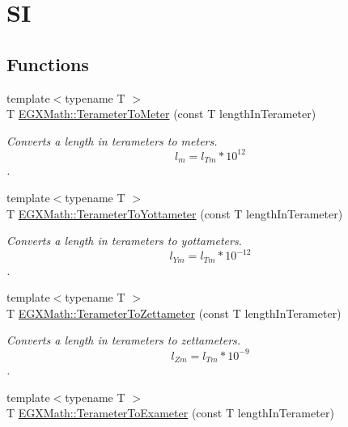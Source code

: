\hypertarget{group___e_g_x_math-_conversions-_length_conversions-_s_i-_terameter-_s_i}{}\section{SI}
\label{group___e_g_x_math-_conversions-_length_conversions-_s_i-_terameter-_s_i}
\subsection*{Functions}
\begin{DoxyCompactItemize}
\item 
{\footnotesize template$<$typename T $>$ }\\T \mbox{\hyperlink{group___e_g_x_math-_conversions-_length_conversions-_s_i-_terameter-_s_i_ga34f2674bfcf8fb79eda27adf607d0876}{E\+G\+X\+Math\+::\+Terameter\+To\+Meter}} (const T length\+In\+Terameter)
\begin{DoxyCompactList}\small\item\em Converts a length in terameters to meters. \[ l_{m}=l_{Tm} * 10^{12} \]. \end{DoxyCompactList}\item 
{\footnotesize template$<$typename T $>$ }\\T \mbox{\hyperlink{group___e_g_x_math-_conversions-_length_conversions-_s_i-_terameter-_s_i_gab0411fd993ebfe0b23de8d672203f68e}{E\+G\+X\+Math\+::\+Terameter\+To\+Yottameter}} (const T length\+In\+Terameter)
\begin{DoxyCompactList}\small\item\em Converts a length in terameters to yottameters. \[ l_{Ym}=l_{Tm} * 10^{-12} \]. \end{DoxyCompactList}\item 
{\footnotesize template$<$typename T $>$ }\\T \mbox{\hyperlink{group___e_g_x_math-_conversions-_length_conversions-_s_i-_terameter-_s_i_gad897b4a8fd5405a7996ae3437194b030}{E\+G\+X\+Math\+::\+Terameter\+To\+Zettameter}} (const T length\+In\+Terameter)
\begin{DoxyCompactList}\small\item\em Converts a length in terameters to zettameters. \[ l_{Zm}=l_{Tm} * 10^{-9} \]. \end{DoxyCompactList}\item 
{\footnotesize template$<$typename T $>$ }\\T \mbox{\hyperlink{group___e_g_x_math-_conversions-_length_conversions-_s_i-_terameter-_s_i_ga9b268bd91e8ba4853c2732b80bca0539}{E\+G\+X\+Math\+::\+Terameter\+To\+Exameter}} (const T length\+In\+Terameter)

\end{DoxyCompactItemize}
